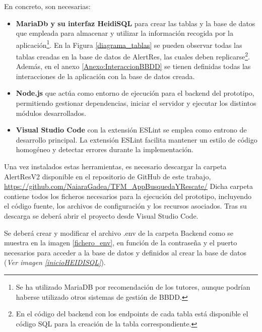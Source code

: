 En concreto, son necesarias:
\begin{itemize}
    \item \textbf{MariaDb y su interfaz HeidiSQL} para crear las tablas y la base de datos que empleada para almacenar y utilizar la información recogida por la aplicación\footnote{Se ha utilizado MariaDB por recomendación de los tutores, aunque podrían haberse utilizado otros sistemas de gestión de BBDD.}. En la Figura \ref{diagrama_tablas} se pueden observar todas las tablas creadas en la base de datos de AlertRes, las cuales deben replicarse\footnote{En el código del backend con los endpoints de cada tabla está disponible el código SQL para la creación de la tabla correspondiente.}. Además, en el anexo \ref{Anexo:InteraccionBBDD} se tienen definidas todas las interacciones de la aplicación con la base de datos creada.\cite{mariadb,heidisql}

    \item \textbf{Node.js} que actúa como entorno de ejecución para el backend del prototipo, permitiendo gestionar dependencias, iniciar el servidor y ejecutar los distintos módulos desarrollados.\cite{nodejs}

    \item \textbf{Visual Studio Code} con la extensión ESLint se emplea como entrono de desarrollo principal. La extensión ESLint facilita mantener un estilo de código homogéneo y detectar errores durante la implementación.\cite{vscode}
\end{itemize}

Una vez instalados estas herramientas, es necesario descargar la carpeta AlertResV2 disponible en el repositorio de GitHub de este trabajo, \url{https://github.com/NaiaraGadea/TFM_AppBusquedaYRescate/} Dicha carpeta contiene todos los ficheros necesarios para la ejecución del prototipo, incluyendo el código fuente, los archivos de configuración y los recursos asociados. Tras su descarga se deberá abrir el proyecto desde Visual Studio Code.

Se deberá crear y modificar el archivo .env de la carpeta Backend como se muestra en la imagen \ref{fichero_env}, en función de la contraseña y el puerto necesarios para acceder a la base de datos y definidos al crear la base de datos (\textit{Ver imagen \ref{inicioHEIDISQL}}). 



